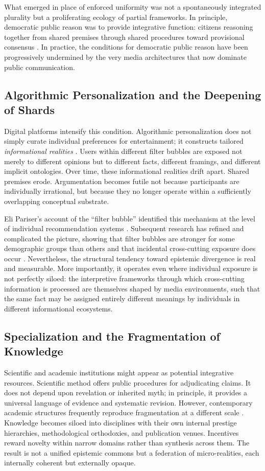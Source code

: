 \documentclass[12pt]{article}
\begin{document}
What emerged in place of enforced uniformity was not a spontaneously integrated plurality but a proliferating ecology of partial frameworks. In principle, democratic public reason was to provide integrative function: citizens reasoning together from shared premises through shared procedures toward provisional consensus \citep{Rawls1993}. In practice, the conditions for democratic public reason have been progressively undermined by the very media architectures that now dominate public communication.

\subsection{Algorithmic Personalization and the Deepening of Shards}

Digital platforms intensify this condition. Algorithmic personalization does not simply curate individual preferences for entertainment; it constructs tailored \emph{informational realities} \citep{Pariser2011}. Users within different filter bubbles are exposed not merely to different opinions but to different facts, different framings, and different implicit ontologies. Over time, these informational realities drift apart. Shared premises erode. Argumentation becomes futile not because participants are individually irrational, but because they no longer operate within a sufficiently overlapping conceptual substrate.

Eli Pariser's account of the ``filter bubble'' identified this mechanism at the level of individual recommendation systems \citep{Pariser2011}. Subsequent research has refined and complicated the picture, showing that filter bubbles are stronger for some demographic groups than others and that incidental cross-cutting exposure does occur \citep{Guess2018}. Nevertheless, the structural tendency toward epistemic divergence is real and measurable. More importantly, it operates even where individual exposure is not perfectly siloed: the interpretive frameworks through which cross-cutting information is processed are themselves shaped by media environments, such that the same fact may be assigned entirely different meanings by individuals in different informational ecosystems.

\subsection{Specialization and the Fragmentation of Knowledge}

Scientific and academic institutions might appear as potential integrative resources. Scientific method offers public procedures for adjudicating claims. It does not depend upon revelation or inherited myth; in principle, it provides a universal language of evidence and systematic revision. However, contemporary academic structures frequently reproduce fragmentation at a different scale \citep{Gibbons1994}. Knowledge becomes siloed into disciplines with their own internal prestige hierarchies, methodological orthodoxies, and publication venues. Incentives reward novelty within narrow domains rather than synthesis across them. The result is not a unified epistemic commons but a federation of micro-realities, each internally coherent but externally opaque.
\end{document}
